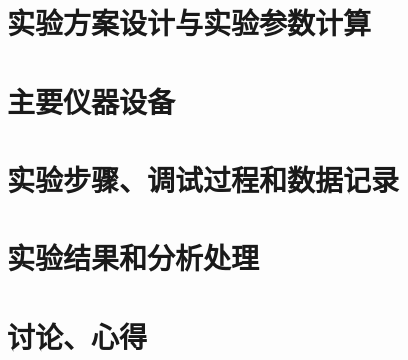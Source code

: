 \documentclass{zjureport}
\begin{document}
\section{实验方案设计与实验参数计算}


\section{主要仪器设备}


\section{实验步骤、调试过程和数据记录}


\section{实验结果和分析处理}


\section{讨论、心得}

% 
\end{document}
